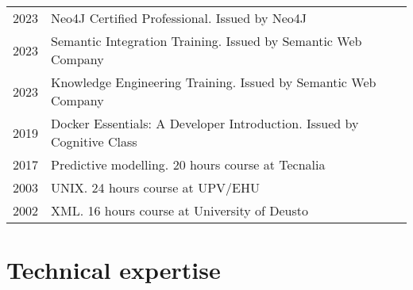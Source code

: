 \documentclass[11pt,fullpage]{article}
\begin{document}
\begin{longtable}{p{0.5in}|p{5.5in}}
  2023 & Neo4J Certified Professional. Issued by Neo4J \\ %
  2023 & Semantic Integration Training. Issued by Semantic Web Company \\ %
  2023 & Knowledge Engineering Training. Issued by Semantic Web Company \\ %
  2019 & Docker Essentials: A Developer Introduction. Issued by Cognitive Class \\ %
  2017 & Predictive modelling. 20 hours course at Tecnalia \\
  2003 & UNIX. 24 hours course at UPV/EHU \\
  2002 & XML. 16 hours course at University of Deusto \\
  
\end{longtable}

\section*{Technical expertise}
\end{document}
